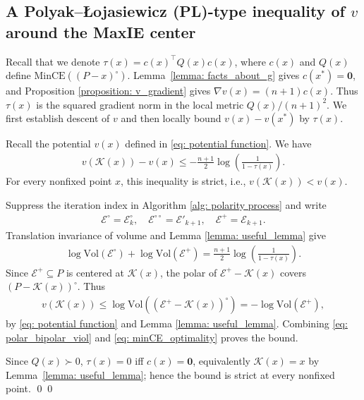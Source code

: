 \documentclass[smallextended]{svjour3}
\let\springerproof\proof
\let\endspringerproof\endproof
\renewenvironment{proof}{\springerproof}{%
  \ifhmode\qed\else\leavevmode\qed\fi\endspringerproof}
\newcommand{\V}{{\mathrm{Vol}}}
\newcommand{\K}{\mathcal{K}}
\newcommand{\E}{\mathcal{E}}
\begin{document}
\subsection[A Polyak–Łojasiewicz (PL)-type inequality of v around the MaxIE center]{A Polyak–Łojasiewicz (PL)-type inequality of $v$ around the MaxIE center}
Recall that we denote $\tau(x) = c(x)^\top Q(x) c(x)$, where $c(x)$ and $Q(x)$ define
$\mathrm{MinCE}((P-x)^\circ)$. Lemma~\ref{lemma: facts_about_g} gives
$c(x^*)=\mathbf{0}$, and Proposition \ref{proposition: v_gradient} gives
$\nabla v(x)=(n+1)c(x)$. Thus $\tau(x)$ is the squared gradient norm in the
local metric $Q(x)/(n+1)^2$. We first establish descent of $v$ and then locally bound
$v(x)-v(x^*)$ by $\tau(x)$.
\begin{lemma}\label{lemma: descent_of_v}
Recall the potential $v(x)$ defined in \eqref{eq: potential function}. We have
\begin{align*}
    v(\K(x)) - v(x) \leq -\frac{n+1}{2}\log\left(\frac{1}{1-\tau(x)}\right).
\end{align*}
For every nonfixed point $x$, this inequality is strict, i.e., 
$v(\K(x))<v(x)$.
\end{lemma}
\begin{proof}
    Suppress the iteration index in Algorithm \ref{alg: polarity process} and write
    \begin{align*}
        \E^\circ = \E^\circ_k, \quad
        \E^{\circ \circ} = \E'_{k+1}, \quad
        \E^+ = \E_{k+1}.
    \end{align*}
    Translation invariance of volume and Lemma \ref{lemma: useful_lemma} give
    \begin{align}\label{eq: polar_bipolar_viol}
        \log \V(\E^\circ) + \log \V(\E^{+}) = \frac{n+1}{2} \log \left( \frac{1}{1-\tau(x)}\right).
    \end{align}
    Since $\E^+\subseteq P$ is centered at $\K(x)$, the polar of
    $\E^+-\K(x)$ covers $(P-\K(x))^\circ$. Thus
    \begin{align}\label{eq: minCE_optimality}
        v(\K(x)) \leq  \log \V((\E^+-\K(x))^\circ) = -\log \V(\E^+),
    \end{align}
    by \eqref{eq: potential function} and Lemma \ref{lemma: useful_lemma}.
    Combining \eqref{eq: polar_bipolar_viol} and \eqref{eq: minCE_optimality}
    proves the bound.

    Since $Q(x)\succ0$, $\tau(x)=0$ iff $c(x)=\mathbf{0}$, equivalently
    $\K(x)=x$ by Lemma~\ref{lemma: useful_lemma}; hence the bound is strict at
    every nonfixed point.
\end{proof}
\end{document}
